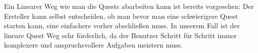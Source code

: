 Ein Linearer Weg wie man die Quests abarbeiten kann ist bereits vorgesehen: Der Ersteller kann selbst entscheiden, ob man bevor man eine schwierigere Quest starten kann, eine einfachere vorher abschließen muss. In unserem Fall ist der lineare Quest Weg sehr förderlich, da der Benutzer Schritt für Schritt immer komplexere und anspruchsvollere Aufgaben meistern muss.
